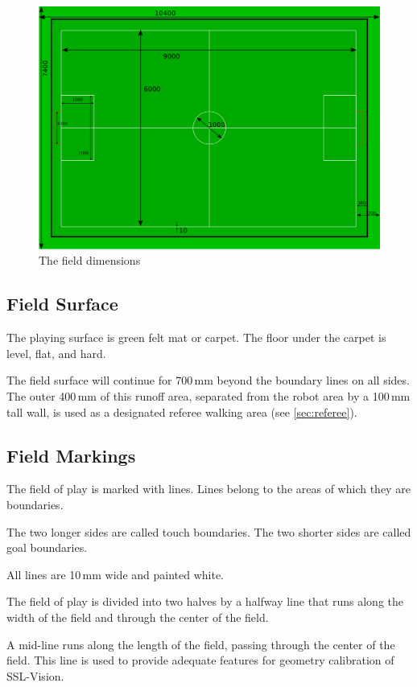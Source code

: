 \begin{figure}[ht] %
  \centering
  \includegraphics[width=0.8\columnwidth]{img/double-size-field.png}
  \caption{The field dimensions }
  \label{fig:double_size_field}
\end{figure}

\subsection{Field Surface}
The playing surface is green felt mat or carpet.
The floor under the carpet is level, flat, and hard.

The field surface will continue for 700\,mm beyond
the boundary lines on all sides.
The outer 400\,mm of this runoff area, separated from the robot area by a
100\,mm tall wall, is used as a designated referee walking area (see
\autoref{sec:referee}).

\subsection{Field Markings}
The field of play is marked with lines.
Lines belong to the areas of which they are boundaries.

The two longer sides are called touch boundaries.
The two shorter sides are called goal boundaries.

All lines are 10\,mm wide and painted white.

The field of play is divided into two halves by a halfway line that runs
along the width of the field and through the center of the field.

A mid-line runs along the length of the field, passing through the center
  of the field. This line is used to provide adequate features for geometry
calibration of SSL-Vision.

